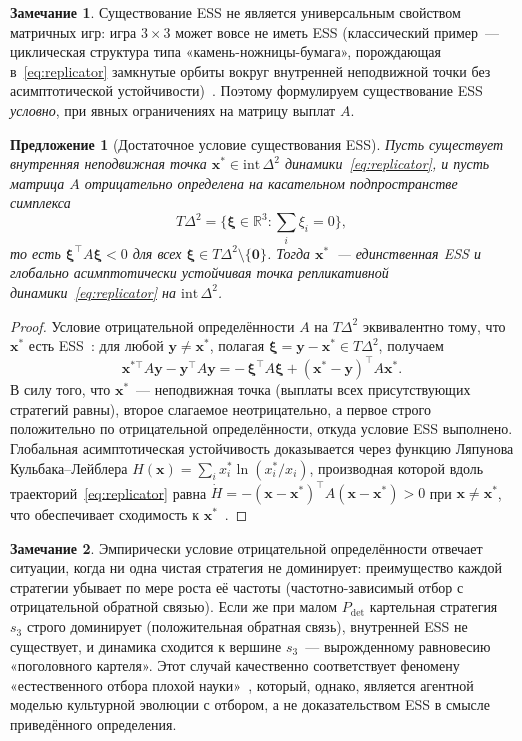 \documentclass[12pt,a4paper]{article}
\newtheorem{proposition}{Предложение}
\theoremstyle{definition}
\newtheorem{remark}{Замечание}
\newcommand{\R}{\mathbb{R}}
\begin{document}
\begin{remark}
  Существование ESS не является универсальным свойством матричных
  игр: игра $3 \times 3$ может вовсе не иметь ESS (классический
    пример~--- циклическая структура типа «камень-ножницы-бумага»,
    порождающая в~\eqref{eq:replicator} замкнутые орбиты вокруг
    внутренней неподвижной точки без асимптотической
  устойчивости)~\citep{hofbauer1998}. Поэтому формулируем
  существование ESS \emph{условно}, при явных ограничениях на матрицу
  выплат $A$.
\end{remark}

\begin{proposition}[Достаточное условие существования ESS]
  \label{prop:ess}
  Пусть существует внутренняя неподвижная точка $\bm{x}^{*} \in
  \mathrm{int}\,\Delta^2$ динамики~\eqref{eq:replicator}, и пусть
  матрица $A$ отрицательно определена на касательном подпространстве симплекса
  \[
    T\Delta^2 = \bigl\{\bm{\xi} \in \R^3 : \textstyle\sum_i \xi_i = 0\bigr\},
  \]
  то есть $\bm{\xi}^{\top} A \bm{\xi} < 0$ для всех $\bm{\xi} \in
  T\Delta^2 \setminus \{\bm{0}\}$. Тогда $\bm{x}^{*}$~---
  единственная ESS и глобально асимптотически устойчивая точка
  репликативной динамики~\eqref{eq:replicator} на $\mathrm{int}\,\Delta^2$.
\end{proposition}

\begin{proof}
  Условие отрицательной определённости $A$ на $T\Delta^2$
  эквивалентно тому, что $\bm{x}^{*}$ есть ESS~\citep{hofbauer1998}:
  для любой $\bm{y} \neq \bm{x}^{*}$, полагая $\bm{\xi} = \bm{y} -
  \bm{x}^{*} \in T\Delta^2$, получаем
  \[
    \bm{x}^{*\top} A \bm{y} - \bm{y}^{\top} A \bm{y} =
    -\,\bm{\xi}^{\top} A \bm{\xi} + (\bm{x}^{*} - \bm{y})^{\top} A \bm{x}^{*}.
  \]
  В силу того, что $\bm{x}^*$~--- неподвижная точка (выплаты всех
  присутствующих стратегий равны), второе слагаемое неотрицательно, а
  первое строго положительно по отрицательной определённости, откуда
  условие ESS выполнено. Глобальная асимптотическая устойчивость
  доказывается через функцию Ляпунова Кульбака--Лейблера $H(\bm{x}) =
  \sum_i x_i^{*} \ln(x_i^{*}/x_i)$, производная которой вдоль
  траекторий~\eqref{eq:replicator} равна $\dot{H} = -(\bm{x} -
  \bm{x}^{*})^{\top} A (\bm{x} - \bm{x}^{*}) > 0$ при $\bm{x} \neq
  \bm{x}^*$, что обеспечивает сходимость к $\bm{x}^{*}$~\citep{hofbauer1998}.
\end{proof}

\begin{remark}
  Эмпирически условие отрицательной определённости отвечает ситуации,
  когда ни одна чистая стратегия не доминирует: преимущество каждой
  стратегии убывает по мере роста её частоты (частотно-зависимый
  отбор с отрицательной обратной связью). Если же при малом
  $P_{\mathrm{det}}$ картельная стратегия $s_3$ строго доминирует
  (положительная обратная связь), внутренней ESS не существует, и
  динамика сходится к вершине $s_3$~--- вырожденному равновесию
  «поголовного картеля». Этот случай качественно соответствует
  феномену «естественного отбора плохой науки»~\citep{smaldino2016},
  который, однако, является агентной моделью культурной эволюции с
  отбором, а не доказательством ESS в смысле приведённого определения.
\end{remark}
\end{document}
